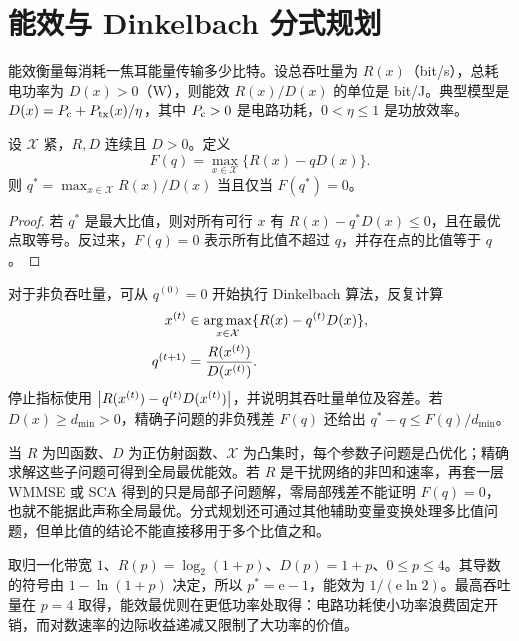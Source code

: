 \section{能效与 Dinkelbach 分式规划}
\label{sec:dinkelbach}

能效衡量每消耗一焦耳能量传输多少比特。设总吞吐量为 $R(x)$（bit/s），总耗电功率为 $D(x)>0$（W），则能效 $R(x)/D(x)$ 的单位是 bit/J。典型模型是 $D(x)=P_{\rm c}+P_{\rm tx}(x)/\eta$，其中 $P_{\rm c}>0$ 是电路功耗，$0<\eta\leq1$ 是功放效率。

\begin{proposition}[比值最优的零残差判据]
设 $\mathcal X$ 紧，$R,D$ 连续且 $D>0$。定义
\begin{equation}
 F(q)=\max_{x\in\mathcal X}\{R(x)-qD(x)\}.
 \label{eq:dink-F}
\end{equation}
则 $q^*=\max_{x\in\mathcal X}R(x)/D(x)$ 当且仅当 $F(q^*)=0$。
\end{proposition}
\begin{proof}
若 $q^*$ 是最大比值，则对所有可行 $x$ 有 $R(x)-q^*D(x)\leq0$，且在最优点取等号。反过来，$F(q)=0$ 表示所有比值不超过 $q$，并存在点的比值等于 $q$。
\end{proof}

对于非负吞吐量，可从 $q^{(0)}=0$ 开始执行 Dinkelbach 算法，反复计算
\begin{align}
 x^{(t)}&\in\operatorname*{arg\,max}_{x\in\mathcal X}
       \{R(x)-q^{(t)}D(x)\},\\
 q^{(t+1)}&=\frac{R(x^{(t)})}{D(x^{(t)})}.
 \label{eq:dink-update}
\end{align}
停止指标使用 $\left\lvert R(x^{(t)})-q^{(t)}D(x^{(t)})\right\rvert$，并说明其吞吐量单位及容差。若 $D(x)\geq d_{\min}>0$，精确子问题的非负残差 $F(q)$ 还给出 $q^*-q\leq F(q)/d_{\min}$。

当 $R$ 为凹函数、$D$ 为正仿射函数、$\mathcal X$ 为凸集时，每个参数子问题是凸优化；精确求解这些子问题可得到全局最优能效\cite{dinkelbach1967}。若 $R$ 是干扰网络的非凹和速率，再套一层 WMMSE 或 SCA 得到的只是局部子问题解，零局部残差不能证明 $F(q)=0$，也就不能据此声称全局最优。分式规划还可通过其他辅助变量变换处理多比值问题，但单比值的结论不能直接移用于多个比值之和\cite{shen2018}。

\begin{example}[单链路的能效功率]
取归一化带宽 $1$、$R(p)=\log_2(1+p)$、$D(p)=1+p$、$0\leq p\leq4$。其导数的符号由 $1-\ln(1+p)$ 决定，所以 $p^*=\mathrm e-1$，能效为 $1/(\mathrm e\ln2)$。最高吞吐量在 $p=4$ 取得，能效最优则在更低功率处取得：电路功耗使小功率浪费固定开销，而对数速率的边际收益递减又限制了大功率的价值。
\end{example}

